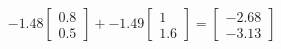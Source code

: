 \documentclass[preview]{standalone}
\begin{document}
\begin{align*}
-1.48 \begin{bmatrix} 0.8 \\ 0.5 \end{bmatrix} + -1.49 \begin{bmatrix} 1 \\ 1.6 \end{bmatrix} = \begin{bmatrix} -2.68 \\ -3.13 \end{bmatrix}
\end{align*}
\end{document}
